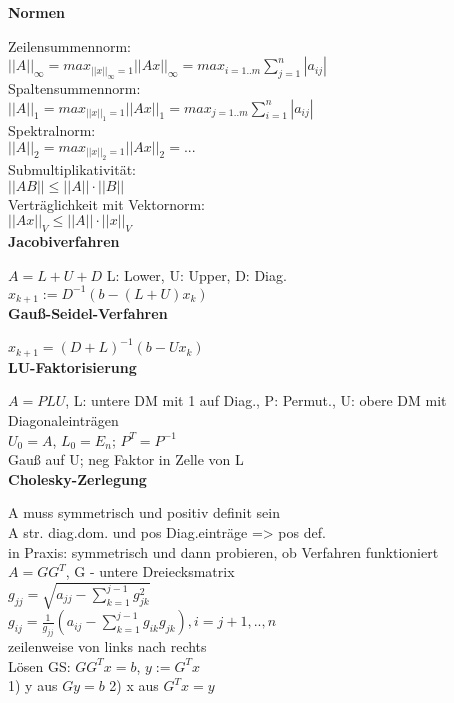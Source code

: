 \documentclass[10pt,twocolumn,a4paper]{article}
\begin{document}
\begin{flushleft}
\textbf{Normen}

Zeilensummennorm:\\
$||A||_\infty = max_{||x||_\infty=1}||Ax||_\infty=max_{i=1..m}\sum_{j=1}^n |a_{ij}|$\\
Spaltensummennorm:\\
$||A||_1 = max_{||x||_1=1}||Ax||_1=max_{j=1..m}\sum_{i=1}^n |a_{ij}|$\\
Spektralnorm:\\
$||A||_2 = max_{||x||_2=1}||Ax||_2=...$\\
Submultiplikativität:\\
$||AB|| \leq ||A|| \cdot ||B||$\\
Verträglichkeit mit Vektornorm:\\
$||Ax||_V \leq ||A|| \cdot ||x||_V$\\


\textbf{Jacobiverfahren}

$A = L + U + D$ L: Lower, U: Upper, D: Diag.\\
$x_{k+1} := D^{-1}(b-(L+U)x_k)$\\

\textbf{Gauß-Seidel-Verfahren}

$x_{k+1} = (D+L)^{-1} (b-Ux_k)$\\

\textbf{LU-Faktorisierung}

$A = PLU$, L: untere DM mit 1 auf Diag., P: Permut., U: obere DM mit Diagonaleinträgen\\
$U_0 = A$, $L_0 = E_n$; $P^T = P^{-1}$\\
Gauß auf U; neg Faktor in Zelle von L \\

\textbf{Cholesky-Zerlegung}

A muss symmetrisch und positiv definit sein\\
A str. diag.dom. und pos Diag.einträge => pos def.\\
in Praxis: symmetrisch und dann probieren, ob Verfahren funktioniert\\
$A = GG^T$, G - untere Dreiecksmatrix\\
$g_{jj} = \sqrt{a_{jj} - \sum_{k=1}^{j-1} g_{jk}^2}$\\
$g_{ij} = \frac{1}{g_{jj}} (a_{ij} - \sum_{k=1}^{j-1} g_{ik}g_{jk}), i=j+1,..,n$\\
zeilenweise von links nach rechts\\
Lösen GS: $GG^Tx=b$, $y:=G^Tx$\\
1) y aus $Gy=b$ 2) x aus $G^Tx=y$\\


\end{flushleft}
\end{document}
